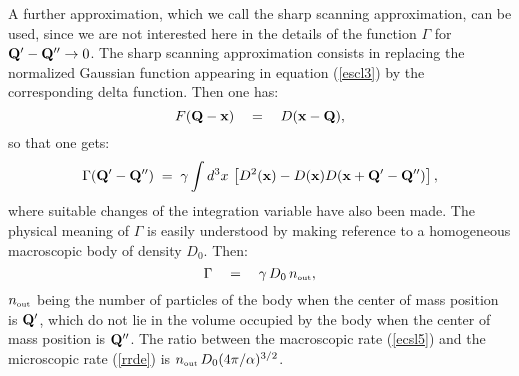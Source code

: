 \documentclass[12pt]{article}
\begin{document}
A further approximation, which we call the sharp scanning
approximation, can be used, since we are not interested here in
the details of the function $\Gamma$ for ${\bf Q}' - {\bf Q}''
\rightarrow 0$. The sharp scanning approximation consists in
replacing the normalized Gaussian function appearing in equation
(\ref{escl3}) by the corresponding delta function. Then one has:
\begin{equation}
F({\bf Q} - {\bf x}) \quad = \quad D({\bf x} - {\bf Q}),
\end{equation}
so that one gets:
\begin{equation} \label{gss}
\Gamma ({\bf Q}' - {\bf Q}'') \; = \; \gamma \int d^{3} x\, \left[
D^{2}({\bf x}) - D({\bf x}) D({\bf x} + {\bf Q}' - {\bf Q}'')
\right],
\end{equation}
where suitable changes of the integration variable have also been
made. The physical meaning of $\Gamma$ is easily understood by
making reference to a homogeneous macroscopic body of density
$D_{0}$. Then:
\begin{equation} \label{ecsl5}
\Gamma \quad = \quad \gamma\, D_{0}\, n_{\makebox{\tiny out}},
\end{equation}
$n_{\makebox{\tiny out}}$ being the number of particles of the
body when the center of mass position is ${\bf Q}'$, which do not
lie in the volume occupied by the body when the center of mass
position is ${\bf Q}''$. The ratio between the macroscopic rate
(\ref{ecsl5}) and the microscopic rate (\ref{rrde}) is
$n_{\makebox{\tiny out}}\, D_{0} ( 4\pi /\alpha)^{3/2}$.
\end{document}

